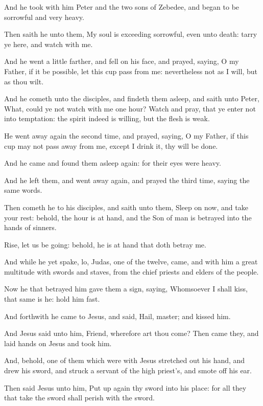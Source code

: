 \verse And he took with him Peter and the two sons of Zebedee, and began to be sorrowful and very heavy.

\verse Then saith he unto them, My soul is exceeding sorrowful, even unto death: tarry ye here, and watch with me.

\verse And he went a little farther, and fell on his face, and prayed, saying, O my Father, if it be possible, let this cup pass from me: nevertheless not as I will, but as thou wilt.

\verse And he cometh unto the disciples, and findeth them asleep, and saith unto Peter, What, could ye not watch with me one hour?  \verse Watch and pray, that ye enter not into temptation: the spirit indeed is willing, but the flesh is weak.

\verse He went away again the second time, and prayed, saying, O my Father, if this cup may not pass away from me, except I drink it, thy will be done.

\verse And he came and found them asleep again: for their eyes were heavy.

\verse And he left them, and went away again, and prayed the third time, saying the same words.

\verse Then cometh he to his disciples, and saith unto them, Sleep on now, and take your rest: behold, the hour is at hand, and the Son of man is betrayed into the hands of sinners.

\verse Rise, let us be going: behold, he is at hand that doth betray me.

\verse And while he yet spake, lo, Judas, one of the twelve, came, and with him a great multitude with swords and staves, from the chief priests and elders of the people.

\verse Now he that betrayed him gave them a sign, saying, Whomsoever I shall kiss, that same is he: hold him fast.

\verse And forthwith he came to Jesus, and said, Hail, master; and kissed him.

\verse And Jesus said unto him, Friend, wherefore art thou come? Then came they, and laid hands on Jesus and took him.

\verse And, behold, one of them which were with Jesus stretched out his hand, and drew his sword, and struck a servant of the high priest's, and smote off his ear.

\verse Then said Jesus unto him, Put up again thy sword into his place: for all they that take the sword shall perish with the sword.

